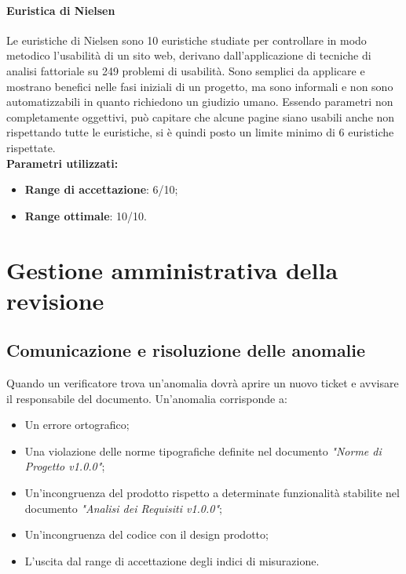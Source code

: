 \documentclass[12pt,a4paper,titlepage]{article}
\begin{document}
			\paragraph{Euristica di Nielsen}
			Le euristiche di Nielsen sono 10 euristiche studiate per controllare in modo metodico l'usabilità di un sito web, derivano dall'applicazione di tecniche di analisi fattoriale su 249 problemi di usabilità. Sono semplici da applicare e mostrano benefici nelle fasi iniziali di un progetto, ma sono informali e non sono automatizzabili in quanto richiedono un giudizio umano. Essendo parametri non completamente oggettivi, può capitare che alcune pagine siano usabili anche non rispettando tutte le euristiche, si è quindi posto un limite minimo di 6 euristiche rispettate.\\
			\textbf{Parametri utilizzati:}
			\begin{itemize}
				\item \textbf{Range di accettazione}: 6/10;
				\item \textbf{Range ottimale}: 10/10.
			\end{itemize}
			
	\newpage
	\section{Gestione amministrativa della revisione}
		\subsection{Comunicazione e risoluzione delle anomalie}
		Quando un verificatore trova un'anomalia dovrà aprire un nuovo ticket e avvisare il responsabile del documento. Un'anomalia corrisponde a:
		\begin{itemize}
			\item Un errore ortografico;
			\item Una violazione delle norme tipografiche definite nel documento \textit{"Norme di Progetto v1.0.0"}; 
			\item Un'incongruenza del prodotto rispetto a determinate funzionalità stabilite nel documento \textit{"Analisi dei Requisiti v1.0.0"};
			\item Un'incongruenza del codice con il design prodotto;
			\item L'uscita dal range di accettazione degli indici di misurazione.
		\end{itemize}
	
	\newpage
\end{document}
